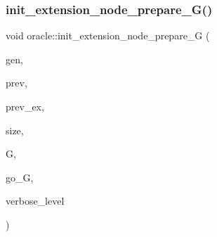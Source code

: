 \subsubsection{\texorpdfstring{init\+\_\+extension\+\_\+node\+\_\+prepare\+\_\+\+G()}{init\_extension\_node\_prepare\_G()}}
{\footnotesize\ttfamily void oracle\+::init\+\_\+extension\+\_\+node\+\_\+prepare\+\_\+G (\begin{DoxyParamCaption}\item[{\mbox{\hyperlink{classgenerator}{generator}} $\ast$}]{gen,  }\item[{\mbox{\hyperlink{galois_8h_a09fddde158a3a20bd2dcadb609de11dc}{I\+NT}}}]{prev,  }\item[{\mbox{\hyperlink{galois_8h_a09fddde158a3a20bd2dcadb609de11dc}{I\+NT}}}]{prev\+\_\+ex,  }\item[{\mbox{\hyperlink{galois_8h_a09fddde158a3a20bd2dcadb609de11dc}{I\+NT}}}]{size,  }\item[{\mbox{\hyperlink{classgroup}{group}} \&}]{G,  }\item[{\mbox{\hyperlink{classlonginteger__object}{longinteger\+\_\+object}} \&}]{go\+\_\+G,  }\item[{\mbox{\hyperlink{galois_8h_a09fddde158a3a20bd2dcadb609de11dc}{I\+NT}}}]{verbose\+\_\+level }\end{DoxyParamCaption})}

\mbox{\label{classoracle_a6a121e9674bbd011685430a95dbc1b77}} 
